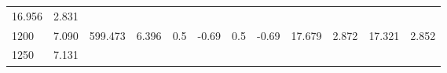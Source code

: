\documentclass{article}
\begin{document}
\begin{longtable}[]{@{}llllllllllll@{}}
\begin{minipage}[t]{0.06\columnwidth}
16.956\strut
\end{minipage} & \begin{minipage}[t]{0.09\columnwidth}\raggedright\strut
2.831\strut
\end{minipage}\tabularnewline
\begin{minipage}[t]{0.03\columnwidth}\raggedright\strut
1200\strut
\end{minipage} & \begin{minipage}[t]{0.06\columnwidth}\raggedright\strut
7.090\strut
\end{minipage} & \begin{minipage}[t]{0.06\columnwidth}\raggedright\strut
599.473\strut
\end{minipage} & \begin{minipage}[t]{0.08\columnwidth}\raggedright\strut
6.396\strut
\end{minipage} & \begin{minipage}[t]{0.03\columnwidth}\raggedright\strut
0.5\strut
\end{minipage} & \begin{minipage}[t]{0.06\columnwidth}\raggedright\strut
-0.69\strut
\end{minipage} & \begin{minipage}[t]{0.03\columnwidth}\raggedright\strut
0.5\strut
\end{minipage} & \begin{minipage}[t]{0.06\columnwidth}\raggedright\strut
-0.69\strut
\end{minipage} & \begin{minipage}[t]{0.06\columnwidth}\raggedright\strut
17.679\strut
\end{minipage} & \begin{minipage}[t]{0.08\columnwidth}\raggedright\strut
2.872\strut
\end{minipage} & \begin{minipage}[t]{0.06\columnwidth}\raggedright\strut
17.321\strut
\end{minipage} & \begin{minipage}[t]{0.09\columnwidth}\raggedright\strut
2.852\strut
\end{minipage}\tabularnewline
\begin{minipage}[t]{0.03\columnwidth}\raggedright\strut
1250\strut
\end{minipage} & \begin{minipage}[t]{0.06\columnwidth}\raggedright\strut
7.131\strut
\end{minipage} & \begin{minipage}[t]{0.06\columnwidth}\raggedright\strut

\end{minipage}
\end{longtable}
\end{document}
